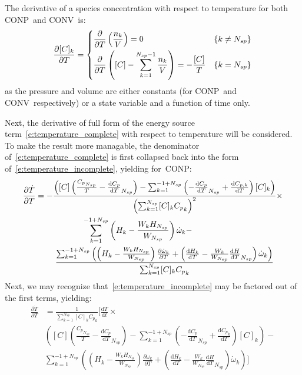 \documentclass[12pt,number,sort&compress]{elsarticle}
\newcommand{\ns}{N_{sp}}
\newcommand{\conp}{CONP}
\newcommand{\conv}{CONV}
\begin{document}
The derivative of a species concentration with respect to temperature for both \conp~and \conv~is:
\begin{align}
 \frac{\partial [C]_{k}}{\partial T} =
 \begin{dcases}
  \frac{\partial}{\partial T} \left(\frac{n_k}{V}\right) = 0 & \left\{k \ne \ns\right\} \\
  \frac{\partial}{\partial T} \left([C] - \sum_{k=1}^{\ns - 1}{\frac{n_k}{V}}\right) = -\frac{[C]}{T} & \left\{k = \ns\right\}
 \end{dcases}
\end{align}
as the pressure and volume are either constants (for \conp~and \conv~respectively) or a state variable and a function of time only.

Next, the derivative of full form of the energy source term~\cref{e:temperature_complete} with respect to temperature will be considered.
To make the result more managable, the denominator of~\cref{e:temperature_complete} is first collapsed back into the form of~\cref{e:temperature_incomplete}, yielding for~\conp:
\begin{align}
 \frac{\partial\dot{T}}{\partial{T}} &= - \frac{\left( [C] \left( \frac{{C_p}_{\ns}}{T} - \frac{\text{d} {C_p} }{\text{d} T }_{\ns} \right) - \sum_{k=1}^{-1 + \ns} \left(- \frac{\text{d} {C_p} }{\text{d} T }_{\ns} + \frac{\text{d} C_{p, k} }{\text{d} T }\right) [C]_{k}\right)}{\left(\sum_{k=1}^{\ns} [C]_{k} {C_p}_{k}\right)^{2}} \times \nonumber \\
				     & \mathindent[largerindent] \sum_{k=1}^{-1 + \ns} \left(H_{k} - \frac{W_{k} H_{\ns}}{W_{\ns}}\right) \dot{\omega}_{k} - \nonumber \\
				     & \mathindent \frac{\sum_{k=1}^{-1 + \ns} \left(\left(H_{k} - \frac{W_{k} H_{\ns}}{W_{\ns}}\right) \frac{\partial \dot{\omega}_{k} }{\partial T } + \left(\frac{\text{d} H_{k} }{\text{d} T } - \frac{W_{k}}{W_{\ns}} \frac{\text{d} H }{\text{d} T }_{\ns}\right) \dot{\omega}_{k}\right)}{\sum_{k=1}^{\ns} [C]_{k} {C_p}_{k}}
\end{align}
Next, we may recognize that~\cref{e:temperature_incomplete} may be factored out of the first terms, yielding:
\begin{align}
 \frac{\partial\dot{T}}{\partial{T}} &= \frac{1}{\sum_{k=1}^{\ns} [C]_{k} {C_p}_{k}} \Biggl[ \frac{\text{d} T }{\text{d} t } \times \nonumber \\
				     & \left( [C] \left( \frac{{C_p}_{\ns}}{T} - \frac{\text{d} {C_p} }{\text{d} T }_{\ns} \right) - \sum_{k=1}^{-1 + \ns} \left(- \frac{\text{d} {C_p} }{\text{d} T }_{\ns} + \frac{\text{d} {C_p}_{k} }{\text{d} T }\right) [C]_{k}\right) - \nonumber \\
				     & \sum_{k=1}^{-1 + \ns} \left(\left(H_{k} - \frac{W_{k} H_{\ns}}{W_{\ns}}\right) \frac{\partial \dot{\omega}_{k} }{\partial T } + \left(\frac{\text{d} H_{k} }{\text{d} T } - \frac{W_{k}}{W_{\ns}} \frac{\text{d} H }{\text{d} T }_{\ns}\right) \dot{\omega}_{k}\right) \Biggr]
\end{align}
\end{document}
